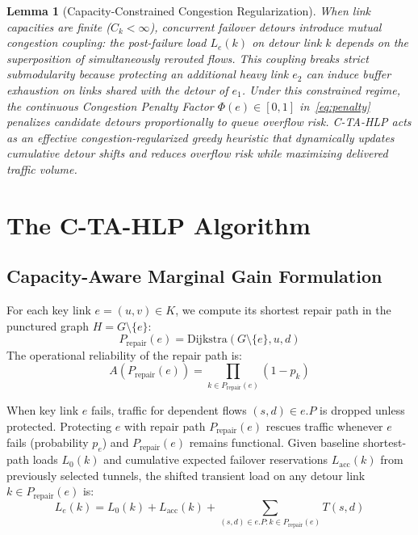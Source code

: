 \documentclass[journal]{IEEEtran}
\newtheorem{lemma}{Lemma}
\begin{document}
\begin{lemma}[Capacity-Constrained Congestion Regularization]
When link capacities are finite ($C_k < \infty$), concurrent failover detours introduce mutual congestion coupling: the post-failure load $L_e(k)$ on detour link $k$ depends on the superposition of simultaneously rerouted flows. This coupling breaks strict submodularity because protecting an additional heavy link $e_2$ can induce buffer exhaustion on links shared with the detour of $e_1$. Under this constrained regime, the continuous Congestion Penalty Factor $\Phi(e) \in [0, 1]$ in~\eqref{eq:penalty} penalizes candidate detours proportionally to queue overflow risk. C-TA-HLP acts as an effective congestion-regularized greedy heuristic that dynamically updates cumulative detour shifts and reduces overflow risk while maximizing delivered traffic volume.
\end{lemma}

\section{The C-TA-HLP Algorithm}

\subsection{Capacity-Aware Marginal Gain Formulation}
For each key link $e = (u, v) \in K$, we compute its shortest repair path in the punctured graph $H = G \setminus \{e\}$:
\begin{equation}
P_{\text{repair}}(e) = \text{Dijkstra}(G \setminus \{e\}, u, d)
\end{equation}
The operational reliability of the repair path is:
\begin{equation}
A(P_{\text{repair}}(e)) = \prod_{k \in P_{\text{repair}}(e)} (1 - p_k)
\end{equation}

When key link $e$ fails, traffic for dependent flows $(s, d) \in e.P$ is dropped unless protected. Protecting $e$ with repair path $P_{\text{repair}}(e)$ rescues traffic whenever $e$ fails (probability $p_e$) and $P_{\text{repair}}(e)$ remains functional. Given baseline shortest-path loads $L_0(k)$ and cumulative expected failover reservations $L_{\text{acc}}(k)$ from previously selected tunnels, the shifted transient load on any detour link $k \in P_{\text{repair}}(e)$ is:
\begin{equation}
L_e(k) = L_0(k) + L_{\text{acc}}(k) + \sum_{(s,d) \in e.P: k \in P_{\text{repair}}(e)} T(s, d)
\end{equation}
\end{document}
